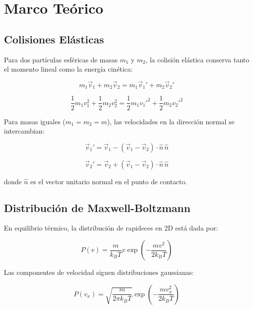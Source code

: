 \documentclass[12pt,a4paper]{article}
\begin{document}
\section{Marco Teórico}

\subsection{Colisiones Elásticas}

Para dos partículas esféricas de masas $m_1$ y $m_2$, la colisión elástica conserva tanto el momento lineal como la energía cinética:

\begin{equation}
m_1\vec{v}_1 + m_2\vec{v}_2 = m_1\vec{v}_1' + m_2\vec{v}_2'
\end{equation}

\begin{equation}
\frac{1}{2}m_1v_1^2 + \frac{1}{2}m_2v_2^2 = \frac{1}{2}m_1v_1'^2 + \frac{1}{2}m_2v_2'^2
\end{equation}

Para masas iguales ($m_1 = m_2 = m$), las velocidades en la dirección normal se intercambian:

\begin{equation}
\vec{v}_1' = \vec{v}_1 - \left(\vec{v}_1 - \vec{v}_2\right) \cdot \hat{n} \, \hat{n}
\end{equation}

\begin{equation}
\vec{v}_2' = \vec{v}_2 + \left(\vec{v}_1 - \vec{v}_2\right) \cdot \hat{n} \, \hat{n}
\end{equation}

donde $\hat{n}$ es el vector unitario normal en el punto de contacto.

\subsection{Distribución de Maxwell-Boltzmann}

En equilibrio térmico, la distribución de rapideces en 2D está dada por:

\begin{equation}
P(v) = \frac{m}{k_B T} v \exp\left(-\frac{mv^2}{2k_B T}\right)
\end{equation}

Las componentes de velocidad siguen distribuciones gaussianas:

\begin{equation}
P(v_x) = \sqrt{\frac{m}{2\pi k_B T}} \exp\left(-\frac{mv_x^2}{2k_B T}\right)
\end{equation}
\end{document}
